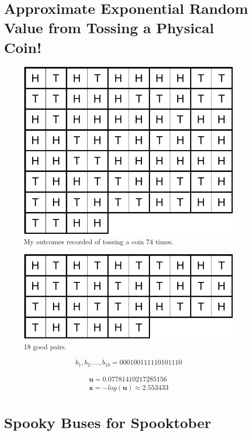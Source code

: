 \documentclass[twocolumn]{article}
\begin{document}
\section{Approximate Exponential Random Value from Tossing a Physical Coin!}

\begin{figure}[H]
	\centering
	\includegraphics[width=0.65\linewidth]{../drawings/p5}
	\caption{My outcomes recorded of tossing a coin 74 times.}
\end{figure}
\begin{figure}[H]
	\centering
	\includegraphics[width=0.65\linewidth]{../drawings/p5.1}
	\caption{18 good pairs.}
\end{figure}

\begin{align*}
	b_1, b_2, ..., b_{18} = 000100111110101110
\end{align*}


\begin{align*}
	\mathbf{u} = 0.07781410217285156\\
	\mathbf{x} = -log(\mathbf{u}) ≈ 2.553433
\end{align*}



\section{Spooky Buses for Spooktober}
\end{document}
